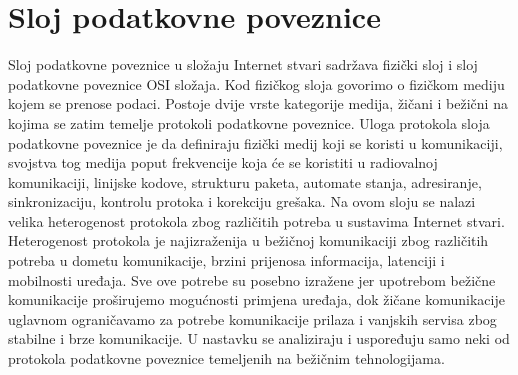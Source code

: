 \documentclass[times, utf8, diplomski]{fer}
\begin{document}

\section{Sloj podatkovne poveznice}
Sloj podatkovne poveznice u složaju Internet stvari sadržava fizički sloj i sloj podatkovne poveznice OSI složaja. Kod fizičkog sloja govorimo o fizičkom mediju kojem se prenose podaci. Postoje dvije vrste kategorije medija, žičani i bežični na kojima se zatim temelje protokoli podatkovne poveznice. Uloga protokola sloja podatkovne poveznice je da definiraju fizički medij koji se koristi u komunikaciji, svojstva tog medija poput frekvencije koja će se koristiti u radiovalnoj komunikaciji, linijske kodove, strukturu paketa, automate stanja, adresiranje, sinkronizaciju, kontrolu protoka i korekciju grešaka. Na ovom sloju se nalazi velika heterogenost protokola zbog različitih potreba u sustavima Internet stvari. Heterogenost protokola je najizraženija u bežičnoj komunikaciji zbog različitih potreba u dometu komunikacije, brzini prijenosa informacija, latenciji i mobilnosti uređaja. Sve ove potrebe su posebno izražene jer upotrebom bežične komunikacije proširujemo mogućnosti primjena uređaja, dok žičane komunikacije uglavnom ograničavamo za potrebe komunikacije prilaza i vanjskih servisa zbog stabilne i brze komunikacije. U nastavku se analiziraju i uspoređuju samo neki od protokola podatkovne poveznice temeljenih na bežičnim tehnologijama.
\end{document}
